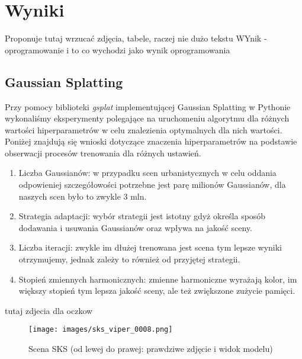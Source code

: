 \section{Wyniki}



Proponuje tutaj wrzucać zdjęcia, tabele, raczej nie dużo tekstu
WYnik - oprogramowanie i to co wychodzi jako wynik oprogramowania 

\subsection{Gaussian Splatting}
Przy pomocy biblioteki \textit{gsplat} implementującej Gaussian Splatting w Pythonie wykonaliśmy eksperymenty polegające na uruchomeniu algorytmu dla różnych wartości hiperparametrów w celu znalezienia optymalnych dla nich wartości. Poniżej znajdują się wnioski dotyczące znaczenia hiperparametrów na podstawie obserwacji procesów trenowania dla różnych ustawień.

\begin{enumerate}
    \item Liczba Gaussianów: w przypadku scen urbanistycznych w celu oddania odpowieniej szczegółowości potrzebne jest parę milionów Gaussianów, dla naszych scen było to zwykle 3 mln.
    \item Strategia adaptacji: wybór strategii jest istotny gdyż określa sposób dodawania i usuwania Gaussianów oraz wpływa na jakość sceny.
    \item Liczba iteracji: zwykle im dłużej trenowana jest scena tym lepsze wyniki otrzymujemy, jednak zależy to również od przyjętej strategii.
    \item Stopień zmiennych harmonicznych: zmienne harmoniczne wyrażają kolor, im większy stopień tym lepsza jakość sceny, ale też zwiększone zużycie pamięci.  
\end{enumerate}

tutaj zdjecia dla oczkow 

\begin{figure}[!h]
    \centering
    \texttt{[image: images/sks\_viper\_0008.png]}
    \caption{Scena SKS (od lewej do prawej: prawdziwe zdjęcie i widok modelu)}
    \label{fig:sks_res_0008}
\end{figure}